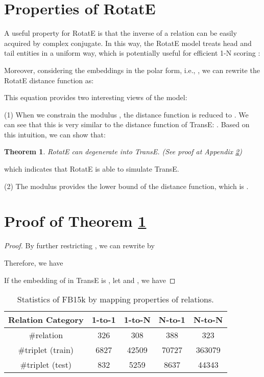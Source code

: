 \documentclass{article} \usepackage{iclr2019_conference,times}
\newtheorem{theorem}{Theorem}
\def\method{RotatE}
\begin{document}
\section{Properties of \method{}} A useful property for \method{} is that the inverse of a relation can be easily acquired by complex conjugate. In this way, the \method{} model treats head and tail entities in a uniform way, which is potentially useful for efficient 1-N scoring \citep{dettmers2017convolutional}:


Moreover, considering the embeddings in the polar form, i.e., , we can rewrite the \method{} distance function as:


This equation provides two interesting views of the model:

(1) When we constrain the modulus , the distance function is reduced to . We can see that this is very similar to the distance function of TransE: . Based on this intuition, we can show that:
\begin{theorem}\label{the1}
\method{} can degenerate into TransE. (See proof at Appendix \ref{sec:the1})
\end{theorem}
which indicates that \method{} is able to simulate TransE.

(2) The modulus provides the lower bound of the distance function, which is .

\section{Proof of Theorem \ref{the1}}  \label{sec:the1}
\begin{proof}
By further restricting , we can rewrite  by

Therefore, we have

If the embedding of  in TransE is , let  and  , we have

\end{proof}











\begin{table}[t]
\centering
\small
\begin{tabular}{|c|c|c|c|c|}
\hline
Relation Category & 1-to-1 & 1-to-N & N-to-1 & N-to-N\\
\hline
\#relation & 326 & 308 & 388 & 323\\
\hline
\#triplet (train) & 6827 & 42509 & 70727 & 363079\\
\hline
\#triplet (test) & 832 & 5259 & 8637 & 44343\\
\hline
\end{tabular}
\caption{Statistics of FB15k by mapping properties of relations.}
\label{tab:one2onest}
\end{table}
\end{document}
